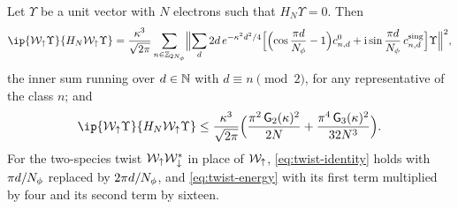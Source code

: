 \begin{lemma}\label{lem:twist-energy}
Let $\Upsilon$ be a unit vector with $N$ electrons such that $H_N\Upsilon=0$. Then
\begin{equation}\label{eq:twist-identity}
\ip{\mathcal W_\up\Upsilon}{H_N\mathcal W_\up\Upsilon}=\frac{\kappa^3}{\sqrt{2\pi}}\sum_{n\in\Z_{2\Nphi}}\Bigl\lVert\sum_{d}2d\,e^{-\kappa^2d^2/4}
\Bigl[\Bigl(\cos\frac{\pi d}\Nphi-1\Bigr)c^0_{n,d}+\iu\sin\frac{\pi d}\Nphi\,c^{\rm sing}_{n,d}\Bigr]\Upsilon\Bigr\rVert^2,
\end{equation}
the inner sum running over $d\in\mathbb{N}$ with $d\equiv n\pmod2$, for any representative of the class $n$; and
\begin{equation}\label{eq:twist-energy}
\ip{\mathcal W_\up\Upsilon}{H_N\mathcal W_\up\Upsilon}\le\frac{\kappa^3}{\sqrt{2\pi}}\Bigl(\frac{\pi^2\,\mathsf G_2(\kappa)^2}{2N}
+\frac{\pi^4\,\mathsf G_3(\kappa)^2}{32N^3}\Bigr).
\end{equation}
For the two-species twist $\mathcal W_{\uparrow}\mathcal W_{\downarrow}^*$ in place of $\mathcal W_{\uparrow}$, \eqref{eq:twist-identity} holds with
$\pi d/N_{\phi}$ replaced by $2\pi d/N_{\phi}$, and \eqref{eq:twist-energy} with its first term multiplied by four and its
second term by sixteen.
\end{lemma}

